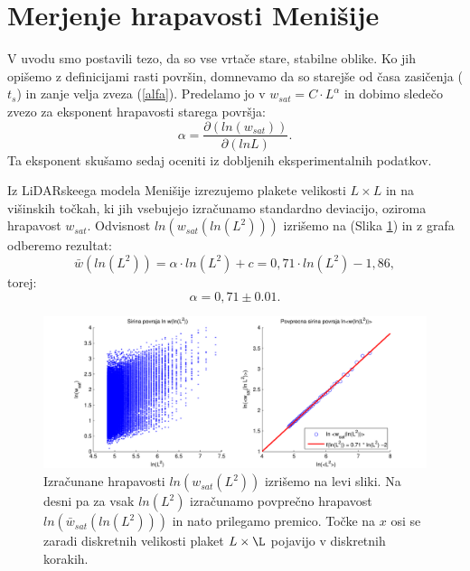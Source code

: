 \documentclass[a4paper, twoside, 12pt]{book}
\begin{document}
\section{Merjenje hrapavosti Menišije}
\label{hrapavost}

V uvodu smo postavili tezo, da so vse vrtače stare, stabilne oblike. Ko jih opišemo z definicijami rasti površin, domnevamo da so starejše od časa zasičenja ($t_s$) in zanje velja zveza (\ref{alfa}). Predelamo jo v $ w_{sat}=C \cdot L^\alpha $ in dobimo sledečo zvezo za eksponent hrapavosti starega površja:
    \begin{equation}
      \alpha = \frac{\partial ( ln (w_{sat}) ) }{\partial ( ln L )}.
      \label{alpha-numeric}
    \end{equation}
Ta eksponent skušamo sedaj oceniti iz dobljenih eksperimentalnih podatkov.

Iz LiDARskeega modela Menišije izrezujemo plakete velikosti $L\times L$ in na višinskih točkah, ki jih vsebujejo izračunamo standardno deviacijo, oziroma hrapavost ${w}_{sat}$. Odvisnost $ln(w_{sat}(ln(L^2)))$ izrišemo na (Slika \ref{fig:menisija-alfa}) in z grafa odberemo rezultat:
\begin{equation}
  \bar w(ln(L^2)) = \alpha \cdot ln(L^2) + c = 0,71 \cdot  ln(L^2) - 1,86,
\end{equation}
torej:
\begin{equation}
  \alpha =  0,71 \pm 0.01.
\end{equation}
\begin{figure}[h!]
  \begin{center}
    \includegraphics[width=14.5cm]{slike/menisija-alfa-3d.pdf}
  \end{center}
  \caption{Izračunane hrapavosti $ln({w}_{sat}(L^2))$ izrišemo na levi sliki. Na desni pa za vsak $ln(L^2)$ izračunamo povprečno hrapavost $ln(\bar w_{sat}(ln(L^2)))$ in nato prilegamo premico. Točke na $x$ osi se zaradi diskretnih velikosti plaket $L\times\L$ pojavijo v diskretnih korakih.}
  \label{fig:menisija-alfa}
\end{figure}
\end{document}
